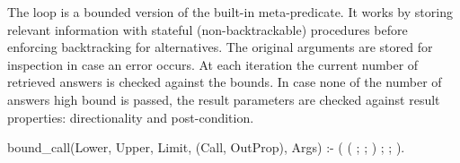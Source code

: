 The loop is a bounded version of the  built-in
meta-predicate.
%
It works by storing relevant information with stateful
(non-backtrackable) procedures before enforcing backtracking for
alternatives.
%
The original arguments are stored for inspection in case an error
occurs.
%
At each iteration the current number of retrieved answers is checked
against the bounds.
%
In case none of the number of answers high bound is passed, the result
parameters are checked against result properties: directionality and
post-condition.
\begin{yapcode}
 bound_call(Lower, Upper, Limit,
            (Call, OutProp), Args) :-
   (
    (
    ;
    ;
    )
   ;
   ;
   ).
\end{yapcode}
\begin{yapcode}
\end{yapcode}

\begin{yapcode}
\end{yapcode}
